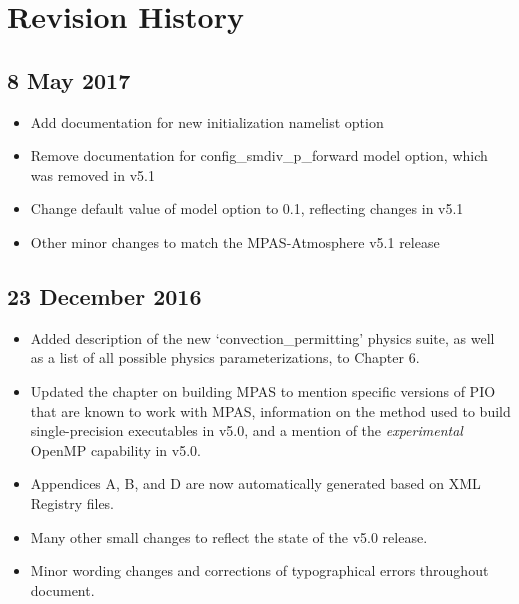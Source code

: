 
\chapter{Revision History}

\section*{8 May 2017}

\begin{itemize}
\item Add documentation for new  initialization namelist option
\item Remove documentation for config\_smdiv\_p\_forward model option, which was removed in v5.1
\item Change default value of  model option to 0.1, reflecting changes in v5.1
\item Other minor changes to match the MPAS-Atmosphere v5.1 release
\end{itemize}

\section*{23 December 2016}

\begin{itemize}
\item Added description of the new `convection\_permitting' physics suite, as well as
a list of all possible physics parameterizations, to Chapter 6.
\item Updated the chapter on building MPAS to mention specific versions of PIO that are known
to work with MPAS, information on the method used to build single-precision executables in v5.0,
and a mention of the {\em experimental} OpenMP capability in v5.0.
\item Appendices A, B, and D are now automatically generated based on XML Registry files.
\item Many other small changes to reflect the state of the v5.0 release.
\item Minor wording changes and corrections of typographical errors throughout document.
\end{itemize}

